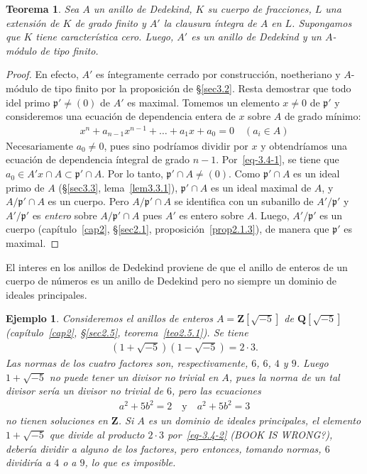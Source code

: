 \documentclass[oneside,bibtotoc,leqno,spanish]{amsbook}
\newcommand{\QQ}{\mathbf{Q}}
\newcommand{\ZZ}{\mathbf{Z}}
\newcommand{\idl}[1]{\mathfrak{#1}}
\newcommand{\QED}{}%
\numberwithin{equation}{section}
\theoremstyle{defi}
\theoremstyle{note}
\newtheorem{theorem}{Teorema}
\theoremstyle{rem}
\newtheorem*{example*}{Ejemplo}
\numberwithin{theorem}{section}
\numberwithin{proposition}{section}
\numberwithin{definition}{section}
\numberwithin{lemma}{section}
\numberwithin{corollary}{section}
\numberwithin{example}{section}
\numberwithin{footnote}{section}%
\begin{document}
\begin{theorem}\label{teo3.4.1}
Sea $A$ un anillo de Dedekind, $K$ su cuerpo de fracciones, $L$ una extensi\'on de $K$ de grado finito y
$A'$ la clausura \'integra de $A$ en $L$. Supongamos que $K$ tiene caracter\'istica cero. Luego,
$A'$ es un anillo de Dedekind y un $A$-m\'odulo de tipo finito.
\end{theorem}

\begin{proof}
En efecto, $A'$ es \'integramente cerrado por construcci\'on, noetheriano y $A$-m\'odulo de tipo finito
por la proposici\'on de \S\ref{sec3.2}. Resta demostrar que todo idel primo $\idl{p}'\neq(0)$ de $A'$ es maximal. Tomemos
un elemento $x\neq 0$ de $\idl{p}'$ y consideremos una ecuaci\'on de dependencia entera de $x$ sobre $A$ de
grado m\'inimo:
\begin{gather}\label{eq-3.4-1}
x^{n}+a_{n-1}x^{n-1}+\dots+a_{1}x+a_{0} = 0\quad(a_{i}\in A)
\end{gather}
Necesariamente $a_{0}\neq 0$, pues sino podr\'iamos dividir por $x$ y obtendr\'iamos una ecuaci\'on de dependencia
\'integral de grado $n-1$. Por~\eqref{eq-3.4-1}, se tiene que $a_{0}\in A'x\cap A\subset\idl{p}'\cap A$. Por lo tanto,
$\idl{p}'\cap A\neq(0)$. Como $\idl{p}'\cap A$ es un ideal primo de $A$ (\S\ref{sec3.3}, lema~\ref{lem3.3.1}), $\idl{p}'\cap A$
es un ideal maximal de $A$, y $A/\idl{p'}\cap A$ es un cuerpo. Pero $A/\idl{p}'\cap A$ se identifica con un
subanillo de $A'/\idl{p}'$ y $A'/\idl{p'}$ es {\em entero} sobre $A/\idl{p}'\cap A$ pues $A'$ es entero
sobre $A$. Luego, $A'/\idl{p}'$ es un cuerpo (cap\'itulo~\ref{cap2}, \S\ref{sec2.1}, proposici\'on~\ref{prop2.1.3}), de manera que $\idl{p}'$
es maximal. \QED
\end{proof}

El interes en los anillos de Dedekind proviene de que el anillo de enteros de un cuerpo de n\'umeros es un
anillo de Dedekind pero no siempre un dominio de ideales principales.

\begin{example*}
Consideremos el anillos de enteros $A = \ZZ[\sqrt{-5}]$ de $\QQ[\sqrt{-5}]$
(cap\'itulo~\ref{cap2}, \S\ref{sec2.5}, teorema~\ref{teo2.5.1}). Se tiene
\begin{gather}\label{eq-3.4-2}
(1+\sqrt{-5})(1-\sqrt{-5}) = 2\cdot 3.
\end{gather}
Las normas de los cuatro factores son, respectivamente, $6$, $6$, $4$ y $9$. Luego
$1+\sqrt{-5}$ no puede tener un divisor no trivial en $A$, pues la norma de un tal divisor
ser\'ia un divisor no trivial de $6$, pero las ecuaciones
\begin{gather*}
a^{2}+5b^{2}=2\quad\text{y}\quad a^{2}+5b^{2}=3
\end{gather*}
no tienen soluciones en $\ZZ$. Si $A$ es un dominio de ideales principales, el elemento $1+\sqrt{-5}$
que divide al producto $2\cdot 3$ por~\eqref{eq-3.4-2} (BOOK IS WRONG?), deber\'ia dividir a alguno de los factores, pero entonces,
tomando normas, $6$ dividir\'ia a $4$ o a $9$, lo que es imposible.
\end{example*}
\end{document}
